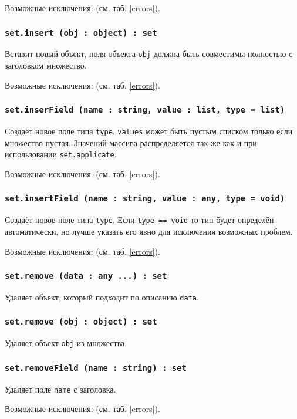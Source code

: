Возможные исключения:  (см. таб. \ref{errors}).

\subsubsection{\texttt{set.insert (obj : object) : set}}

Вставит новый объект, поля объекта \texttt{obj} должна быть совместимы полностью с заголовком множество.

Возможные исключения:  (см. таб. \ref{errors}).

\subsubsection{\texttt{set.inserField (name : string, value : list, type = list)}}

Создаёт новое поле типа \texttt{type}. \texttt{values} может быть пустым списком только если множество пустая. Значений массива распределяется так же как и при использовании \texttt{set.applicate}.

Возможные исключения:  (см. таб. \ref{errors}).

\subsubsection{\texttt{set.insertField (name : string, value : any, type = void)}}

Создаёт новое поле типа \texttt{type}. Если \texttt{type == void} то тип будет определён автоматически, но лучше указать его явно для исключения возможных проблем.

Возможные исключения:  (см. таб. \ref{errors}).

\subsubsection{\texttt{set.remove (data : any ...) : set}}

Удаляет объект, который подходит по описанию \texttt{data}.

\subsubsection{\texttt{set.remove (obj : object) : set}}

Удаляет объект \texttt{obj} из множества.

\subsubsection{\texttt{set.removeField (name : string) : set}}

Удаляет поле \texttt{name} с заголовка.

Возможные исключения:  (см. таб. \ref{errors}).

